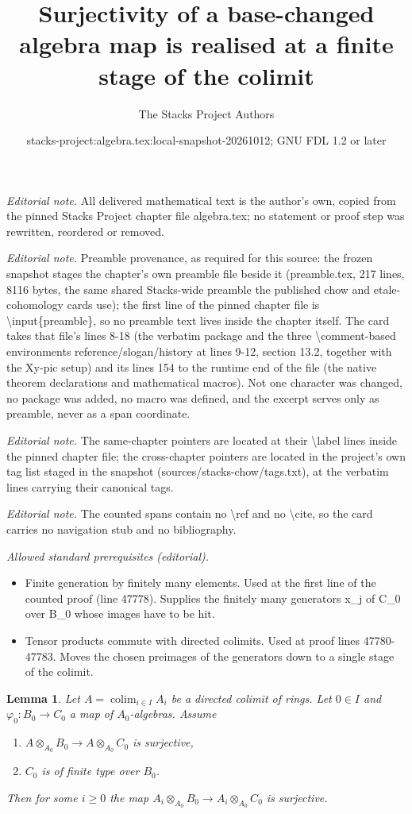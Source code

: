 \documentclass[10pt,a4paper]{amsart}
\title{Surjectivity of a base-changed algebra map is realised at a finite stage of the colimit}
\author{The Stacks Project Authors}
\date{stacks-project:algebra.tex:local-snapshot-20261012; GNU FDL 1.2 or later}
\theoremstyle{plain}
\newtheorem{lemma}[subsection]{Lemma}
\theoremstyle{definition}
\theoremstyle{remark}
\numberwithin{equation}{subsection}
\def\colim{\mathop{\mathrm{colim}}\nolimits}
\begin{document}
\maketitle
\noindent\textit{Editorial note.} All delivered mathematical text is the author's own, copied from the pinned Stacks Project chapter file algebra.tex; no statement or proof step was rewritten, reordered or removed.\par\medskip
\noindent\textit{Editorial note.} Preamble provenance, as required for this source: the frozen snapshot stages the chapter's own preamble file beside it (preamble.tex, 217 lines, 8116 bytes, the same shared Stacks-wide preamble the published chow and etale-cohomology cards use); the first line of the pinned chapter file is \textbackslash{}input\{preamble\}, so no preamble text lives inside the chapter itself. The card takes that file's lines 8-18 (the verbatim package and the three \textbackslash{}comment-based environments reference/slogan/history at lines 9-12, section 13.2, together with the Xy-pic setup) and its lines 154 to the runtime end of the file (the native theorem declarations and mathematical macros). Not one character was changed, no package was added, no macro was defined, and the excerpt serves only as preamble, never as a span coordinate.\par\medskip
\noindent\textit{Editorial note.} The same-chapter pointers are located at their \textbackslash{}label lines inside the pinned chapter file; the cross-chapter pointers are located in the project's own tag list staged in the snapshot (sources/stacks-chow/tags.txt), at the verbatim lines carrying their canonical tags.\par\medskip
\noindent\textit{Editorial note.} The counted spans contain no \textbackslash{}ref and no \textbackslash{}cite, so the card carries no navigation stub and no bibliography.\par\medskip
\noindent\textit{Allowed standard prerequisites (editorial).}\begin{itemize}
\item Finite generation by finitely many elements. Used at the first line of the counted proof (line 47778). Supplies the finitely many generators x\_j of C\_0 over B\_0 whose images have to be hit.
\item Tensor products commute with directed colimits. Used at proof lines 47780-47783. Moves the chosen preimages of the generators down to a single stage of the colimit.
\end{itemize}\medskip
\begin{lemma}
\label{lemma-colimit-surjective}
Let $A = \colim_{i \in I} A_i$ be a directed colimit of rings.
Let $0 \in I$ and $\varphi_0 : B_0 \to C_0$ a map of $A_0$-algebras.
Assume
\begin{enumerate}
\item $A \otimes_{A_0} B_0 \to A \otimes_{A_0} C_0$ is surjective,
\item $C_0$ is of finite type over $B_0$.
\end{enumerate}
Then for some $i \geq 0$ the map
$A_i \otimes_{A_0} B_0 \to A_i \otimes_{A_0} C_0$
is surjective.
\end{lemma}
\end{document}
